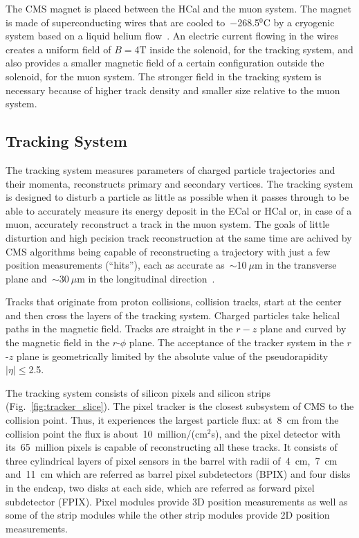 The CMS magnet is placed between the HCal and the muon system. The magnet is made of superconducting wires that are cooled to~$-$268.5$^0$C by a cryogenic system based on a liquid helium flow~\cite{ref_MagnetCryo}. An electric current flowing in the wires creates a uniform field of $B=$4T inside the solenoid, for the tracking system, and also provides a smaller magnetic field of a certain configuration outside the solenoid, for the muon system. The stronger field in the tracking system is necessary because of higher track density and smaller size relative to the muon system.

\subsection{Tracking System}

The tracking system measures parameters of charged particle trajectories and their momenta, reconstructs primary and secondary vertices. The tracking system is designed to disturb a particle as little as possible when it passes through to be able to accurately measure its energy deposit in the ECal or HCal or, in case of a muon, accurately reconstruct a track in the muon system. The goals of little disturtion and high pecision track reconstruction at the same time are achived by CMS algorithms being capable of reconstructing a trajectory with just a few position measurements (``hits''), each as accurate as~$\sim$10$~\mu$m in the transverse plane and~$\sim$30$~\mu$m in the longitudinal direction~\cite{ref_trackerPerformance}.

Tracks that originate from proton collisions, collision tracks, start at the center and then cross the layers of the tracking system. Charged particles take helical paths in the magnetic field. Tracks are straight in the $r-z$ plane and curved by the magnetic field in the $r$-$\phi$ plane. The acceptance of the tracker system in the $r$-$z$ plane is geometrically limited by the absolute value of the pseudorapidity $|\eta| \leq$2.5.

The tracking system consists of silicon pixels and silicon strips (Fig.~\ref{fig:tracker_slice}). The pixel tracker is the closest subsystem of CMS to the collision point. Thus, it experiences the largest particle flux: at~8~cm from the collision point the flux is about~10~million/(cm$^2$s), and the pixel detector with its~65~million pixels is capable of reconstructing all these tracks. It consists of three cylindrical layers of pixel sensors in the barrel with radii of~4~cm,~7~cm and~11~cm which are referred as barrel pixel subdetectors (BPIX) and four disks in the endcap, two disks at each side, which are referred as forward pixel subdetector (FPIX). Pixel modules provide 3D position measurements as well as some of the strip modules while the other strip modules provide 2D position measurements.

